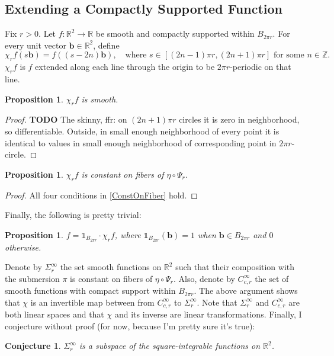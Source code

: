\documentclass[a4paper,11pt]{scrartcl}
\newcounter{dummy}
\numberwithin{dummy}{section}
\theoremstyle{plain}
\newtheorem{proposition}[dummy]{Proposition}
\theoremstyle{plain}
\theoremstyle{plain}
\newtheorem{conjecture}[dummy]{Conjecture}
\theoremstyle{plain}
\theoremstyle{nonumberplain}
\newtheorem{proof}{Proof}
\newcommand{\F}[1][R]{\mathbb{#1}} %
\begin{document}
	\subsection{Extending a Compactly Supported Function}
	Fix $ r > 0 $. Let $ f : \F^{2} \to \F $ be smooth and compactly supported within $ B_{2 \pi r} $. For every unit vector $ \mathbf{b} \in \F^{2} $, define
	\begin{equation*}
	\chi_{r} f (s \mathbf{b})
	= f ((s - 2n) \mathbf{b}), \quad
	\mbox{where }
	s \in [(2n-1) \pi r, (2n+1)\pi r] \mbox{ for some } n \in \F[Z].
	\end{equation*}
	$ \chi_{r} f $ is $ f $ extended along each line through the origin to be $ 2 \pi r $-periodic on that line.
	
	\begin{proposition}
		$ \chi_{r} f $ is smooth.
	\end{proposition}
	
	\begin{proof}
		\textbf{TODO}
		The skinny, ffr: on $ (2n+1)\pi r $ circles it is zero in neighborhood, so differentiable. Outside, in small enough neighborhood of every point it is identical to values in small enough neighborhood of corresponding point in $ 2 \pi r $-circle.
	\end{proof}
	
	\begin{proposition}
		$ \chi_{r} f $ is constant on fibers of $ \eta \circ \Psi_{r} $.
	\end{proposition}
	
	\begin{proof}
		All four conditions in \cref{ConstOnFiber} hold.
	\end{proof}
	
	Finally, the following is pretty trivial:
	\begin{proposition}
		$ f = \mathds{1}_{B_{2 \pi r}} \cdot \chi_{r} f $, where $ \mathds{1}_{B_{2 \pi r}} (\mathbf{b}) = 1 $ when $ \mathbf{b} \in B_{2\pi r} $ and $ 0 $ otherwise.
	\end{proposition}
	
	Denote by $ \Sigma_{r}^{\infty} $ the set smooth functions on $ \F^{2} $ such that their composition with the submersion $ \pi $ is  constant on fibers of $ \eta \circ \Psi_{r} $. Also, denote by $ C_{c,r}^{\infty} $ the set of smooth functions with compact support within $ B_{2 \pi r} $. The above argument shows that $ \chi $ is an invertible map between from $ C_{c,r}^{\infty} $ to $ \Sigma_{r}^{\infty} $. Note that $ \Sigma_{r}^{\infty} $ and $ C_{c,r}^{\infty} $ are both linear spaces and that $ \chi $ and its inverse are linear transformations. Finally, I conjecture without proof (for now, because I'm pretty sure it's true):
	\begin{conjecture}
		$ \Sigma_{r}^{\infty} $ is a subspace of the square-integrable functions on $ \F^{2} $.
	\end{conjecture}
	
\end{document}
